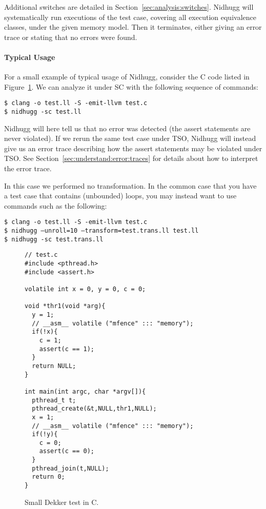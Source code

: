 \documentclass[a4paper]{article}
\begin{document}
\vspace{5pt}\noindent
%
Additional switches are detailed in
Section~\ref{sec:analysis:switches}.
%
Nidhugg will systematically run executions of the test case, covering
all execution equivalence classes, under the given memory model. Then
it terminates, either giving an error trace or stating that no errors
were found.

\paragraph{Typical Usage}
%
For a small example of typical usage of Nidhugg, consider the C code
listed in Figure~\ref{fig:dekker:c}. We can analyze it under SC with
the following sequence of commands:

\vspace{5pt}
\noindent
\texttt{\$ clang -o test.ll -S -emit-llvm test.c}\\
\texttt{\$ nidhugg -sc test.ll}

\vspace{5pt}\noindent
%
Nidhugg will here tell us that no error was detected (the assert
statements are never violated). If we rerun the same test case under
TSO, Nidhugg will instead give us an error trace describing how the
assert statements may be violated under TSO. See
Section~\ref{sec:understand:error:traces} for details about how to
interpret the error trace.

In this case we performed no transformation. In the common case that
you have a test case that contains (unbounded) loops, you may instead
want to use commands such as the following:

\vspace{5pt}
\noindent
\texttt{\$ clang -o test.ll -S -emit-llvm test.c}\\
\texttt{\$ nidhugg --unroll=10 --transform=test.trans.ll test.ll}\\
\texttt{\$ nidhugg -sc test.trans.ll}

\begin{figure}
\begin{verbatim}
// test.c
#include <pthread.h>
#include <assert.h>

volatile int x = 0, y = 0, c = 0;

void *thr1(void *arg){
  y = 1;
  // __asm__ volatile ("mfence" ::: "memory");
  if(!x){
    c = 1;
    assert(c == 1);
  }
  return NULL;
}

int main(int argc, char *argv[]){
  pthread_t t;
  pthread_create(&t,NULL,thr1,NULL);
  x = 1;
  // __asm__ volatile ("mfence" ::: "memory");
  if(!y){
    c = 0;
    assert(c == 0);
  }
  pthread_join(t,NULL);
  return 0;
}
\end{verbatim}
  \caption{Small Dekker test in C.}\label{fig:dekker:c}
\end{figure}
\end{document}
